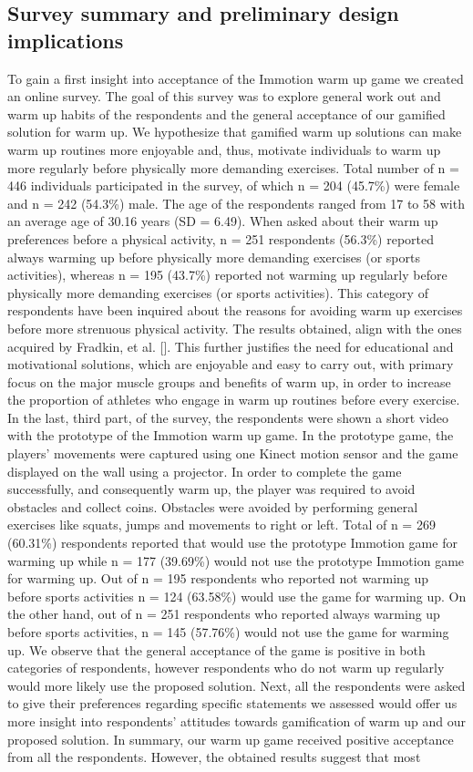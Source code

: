 \subsection{Survey summary and preliminary design implications}
To gain a first insight into acceptance of the Immotion warm up game we created an online survey. The goal of this survey was to explore general work out and warm up habits of the respondents and the general acceptance of our gamified solution for warm up. We hypothesize that gamified warm up solutions can make warm up routines more enjoyable and, thus, motivate individuals to warm up more regularly before physically more demanding exercises. Total number of n = 446 individuals participated in the survey, of which n = 204 (45.7\%) were female and n = 242 (54.3\%) male. The age of the respondents ranged from 17 to 58 with an average age of 30.16 years (SD = 6.49). When asked about their warm up preferences before a physical activity, n = 251 respondents (56.3\%) reported always warming up before physically more demanding exercises (or sports activities), whereas n = 195 (43.7\%) reported not warming up regularly before physically more demanding exercises (or sports activities). This category of respondents have been inquired about the reasons for avoiding warm up exercises before more strenuous physical activity. The results obtained, align with the ones acquired by Fradkin, et al. []. This further justifies the need for educational and motivational solutions, which are enjoyable and easy to carry out, with primary focus on the major muscle groups and benefits of warm up, in order to increase the proportion of athletes who engage in warm up routines before every exercise.\\In the last, third part, of the survey, the respondents were shown a short video with the prototype of the Immotion warm up game. In the prototype game, the players' movements were captured using one Kinect motion sensor and the game displayed on the wall using a projector. In order to complete the game successfully, and consequently warm up, the player was required to avoid obstacles and collect coins. Obstacles were avoided by performing general exercises like squats, jumps and movements to right or left. Total of n = 269 (60.31\%) respondents reported that would use the prototype Immotion game for warming up while n = 177 (39.69\%) would not use the prototype Immotion game for warming up. Out of n = 195 respondents who reported not warming up before sports activities n = 124 (63.58\%) would use the game for warming up. On the other hand, out of n = 251 respondents who reported always warming up before sports activities, n = 145 (57.76\%) would not use the game for warming up. We observe that the general acceptance of the game is positive in both categories of respondents, however respondents who do not warm up regularly would more likely use the proposed solution. Next, all the respondents were asked to give their preferences regarding specific statements we assessed would offer us more insight into respondents' attitudes towards gamification of warm up and our proposed solution. In summary, our warm up game received positive acceptance from all the respondents. However, the obtained results suggest that most 